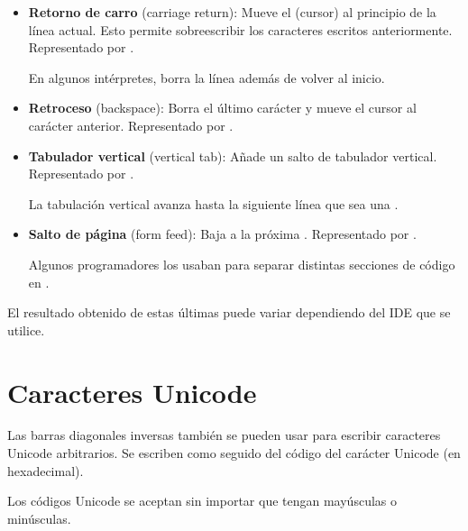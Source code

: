 \begin{itemize}
  \item \textbf{Retorno de carro} (carriage return): Mueve el  (cursor) al principio de la línea actual.
  Esto permite sobreescribir los caracteres escritos anteriormente.
  Representado por .
  

  En algunos intérpretes, borra la línea además de volver al inicio.

  \item \textbf{Retroceso} (backspace): Borra el último carácter y mueve el cursor al carácter anterior.
  Representado por .
  

  \item \textbf{Tabulador vertical} (vertical tab): Añade un salto de tabulador vertical.
  Representado por .
  

  La tabulación vertical avanza hasta la siguiente línea que sea una .

  \item \textbf{Salto de página} (form feed): Baja a la próxima .
  Representado por .
  
  
  Algunos programadores los usaban para separar distintas secciones de código en .

\end{itemize}

El resultado obtenido de estas últimas puede variar dependiendo del IDE que se utilice.

\section{Caracteres Unicode}

Las barras diagonales inversas también se pueden usar para escribir caracteres Unicode arbitrarios.
Se escriben como  seguido del código del carácter Unicode (en hexadecimal).

Los códigos Unicode se aceptan sin importar que tengan mayúsculas o minúsculas.

